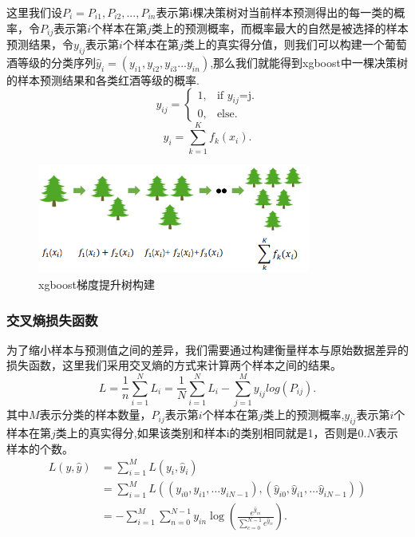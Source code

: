 \documentclass{whutmod}
\begin{document}
这里我们设$P_i={P_{i1},P_{i2},...,P_{in}}$表示第i棵决策树对当前样本预测得出的每一类的概率，令$P_{ij}$表示第$i$个样本在第$j$类上的预测概率，而概率最大的自然是被选择的样本预测结果，令$y_{ij}$表示第$i$个样本在第$j$类上的真实得分值，则我们可以构建一个葡萄酒等级的分类序列$\hat{y}_i=(y_{i1},y_{i2},y_{i3}...y_{in})$,那么我们就能得到xgboost中一棵决策树的样本预测结果和各类红酒等级的概率.
\begin{equation}
y_{ij}=\begin{cases} 
1,&\text{if $y_{ij}$=j}.\\
0,&\text{else}.
\end{cases}
\end{equation}
\begin{equation}
\hat{y}_i=\sum_{k=1}^Kf_k(x_i).
\end{equation}

\begin{figure}[!h]
	\centering
	\includegraphics[width=0.8\textwidth]{tree.png}
	\caption{xgboost梯度提升树构建}
	
\end{figure}

\subsubsection{交叉熵损失函数}
为了缩小样本与预测值之间的差异，我们需要通过构建衡量样本与原始数据差异的损失函数，这里我们采用交叉熵的方式来计算两个样本之间的结果。
\begin{equation}
L=\frac{1}{n}\sum_{i=1}^NL_i=\frac{1}{N}\sum_{i=1}^NL_i-\sum_{j=1}^M
y_{ij}log(P_{ij}).
\end{equation}
其中$M$表示分类的样本数量，$P_{ij}$表示第$i$个样本在第$j$类上的预测概率,$y_{ij}$表示第$i$个样本在第$j$类上的真实得分,如果该类别和样本i的类别相同就是1，否则是0.$N$表示样本的个数。
\begin{equation}
\begin{aligned}
L(y, \hat{y}) &=\sum_{i=1}^{M} L\left(y_{i}, \hat{y}_{i}\right) \\
&=\sum_{i=1}^{M} L\left(\left(y_{i0}, y_{i1}, \ldots y_{iN-1}\right),\left(\hat{y}_{i0}, \hat{y}_{i1}, \ldots \hat{y}_{iN-1}\right)\right) \\
&=-\sum_{i=1}^{M} \sum_{n=0}^{N-1} y_{in} \log \left(\frac{e^{\hat{y}_{in}}}{\sum_{c=0}^{N-1} e^{\hat{y}_{ic}}}\right).
\end{aligned}
\end{equation}
\end{document}
